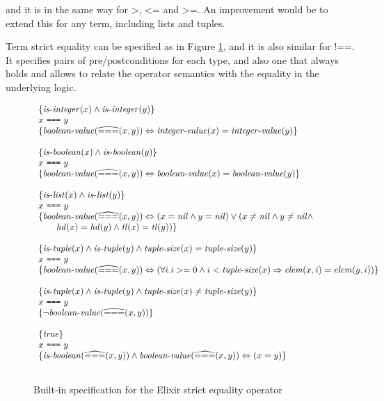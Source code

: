 and it is in the same way for $\texttt{>}$, $\texttt{<=}$ and $\texttt{>=}$. An
improvement would be to extend this for any term, including lists and tuples.

Term strict equality can be specified as in Figure \ref{fig:stricteq}, and it is
also similar for $\texttt{!==}$. It specifies pairs of pre/postconditions for
each type, and also one that always holds and allows to relate the operator 
semantics with the equality in the underlying logic.

\begin{figure}
\[
\begin{array}{l}
\{ \mathit{is\mbox{-}integer}(x) \wedge \mathit{is\mbox{-}integer}(y) \}\\
x~\texttt{===}~y\\
\{ \mathit{boolean\mbox{-}value}(\widehat{===}(x, y)) \Leftrightarrow \mathit{integer\mbox{-}value}(x) = \mathit{integer\mbox{-}value}(y) \}\\
\\
\{ \mathit{is\mbox{-}boolean}(x) \wedge \mathit{is\mbox{-}boolean}(y) \}\\
x~\texttt{===}~y\\
\{ \mathit{boolean\mbox{-}value}(\widehat{===}(x, y)) \Leftrightarrow \mathit{boolean\mbox{-}value}(x) = \mathit{boolean\mbox{-}value}(y) \}\\
\\
\{ \mathit{is\mbox{-}list}(x) \wedge \mathit{is\mbox{-}list}(y) \}\\
x~\texttt{===}~y\\
\{ \mathit{boolean\mbox{-}value}(\widehat{===}(x, y)) \Leftrightarrow 
  (x = \mathit{nil} \wedge y = \mathit{nil})
  \vee (x \neq \mathit{nil} \wedge y \neq \mathit{nil} \wedge\\
  \quad\quad\mathit{hd}(x) = \mathit{hd}(y) \land \mathit{tl}(x) = \mathit{tl}(y)) \}\\
\\
\{ \mathit{is\mbox{-}tuple}(x) \wedge \mathit{is\mbox{-}tuple}(y) \wedge \mathit{tuple\mbox{-}size}(x) = \mathit{tuple\mbox{-}size}(y) \}\\
x~\texttt{===}~y\\
\{ \mathit{boolean\mbox{-}value}(\widehat{===}(x, y)) \Leftrightarrow 
  (\forall i. i >= 0 \wedge i < \mathit{tuple\mbox{-}size}(x) \Rightarrow \mathit{elem}(x, i) = \mathit{elem}(y, i)) \}\\
\\
\{ \mathit{is\mbox{-}tuple}(x) \wedge \mathit{is\mbox{-}tuple}(y) \wedge \mathit{tuple\mbox{-}size}(x) \neq \mathit{tuple\mbox{-}size}(y) \}\\
x~\texttt{===}~y\\
\{ \neg\mathit{boolean\mbox{-}value}(\widehat{===}(x, y)) \}\\
\\
\{\mathit{true}\}\\
x~\texttt{===}~y\\
\{ \mathit{is\mbox{-}boolean}(\widehat{===}(x, y)) \wedge \mathit{boolean\mbox{-}value}(\widehat{===}(x, y)) \Leftrightarrow (x = y) \}\\
\\
\end{array}
\]
\caption{Built-in specification for the Elixir strict equality operator}
\label{fig:stricteq}
\end{figure}

